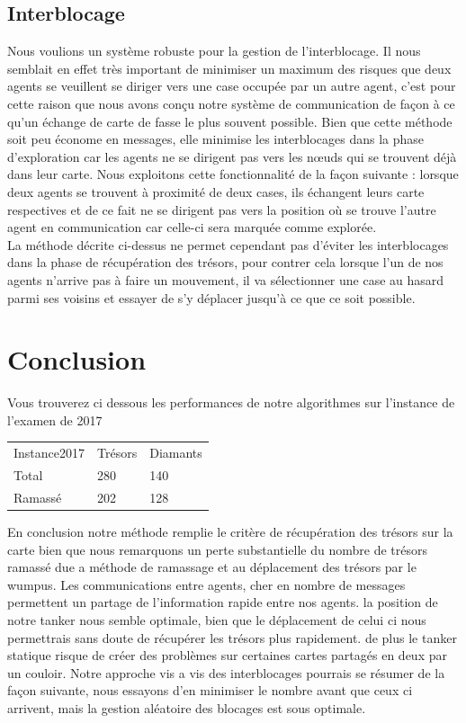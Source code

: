 \documentclass[10pt]{article}
\newcommand\tab[1][0.65cm]{\hspace*{#1}}
\begin{document}
	
\subsection{Interblocage}
\tab Nous voulions un système robuste pour la gestion de l'interblocage. Il nous semblait en effet très important de minimiser un maximum des risques que deux agents se veuillent se diriger vers une case occupée par un autre agent, c'est pour cette raison que nous avons conçu notre système de communication de façon à ce qu'un échange de carte de fasse le plus souvent possible. Bien que cette méthode soit peu économe en messages, elle minimise les interblocages dans la phase d'exploration car les agents ne se dirigent pas vers les n\oe{}uds qui se trouvent déjà dans leur carte. Nous exploitons cette fonctionnalité de la façon suivante : lorsque deux agents se trouvent à proximité de deux cases, ils échangent leurs carte respectives et de ce fait ne se dirigent pas vers la position où se trouve l'autre agent en communication car celle-ci sera marquée comme explorée.\\
\tab La méthode décrite ci-dessus ne permet cependant pas d'éviter les interblocages dans la phase de récupération des trésors, pour contrer cela lorsque l'un de nos agents n'arrive pas à faire un mouvement, il va sélectionner une case au hasard parmi ses voisins et essayer de s'y déplacer jusqu'à ce que ce soit possible.


\section{Conclusion}
\tab Vous trouverez ci dessous les performances de notre algorithmes sur l'instance de l'examen de 2017\\
\begin{center}
\begin{tabular}{lll}
   Instance2017 & Trésors & Diamants \\
   Total & 280 & 140\\
   Ramassé & 202 & 128 \\
\end{tabular}
\end{center}
\tab
En conclusion notre méthode remplie le critère de récupération des trésors sur la carte bien que nous remarquons un perte substantielle du nombre de trésors ramassé due a méthode de ramassage et au déplacement des trésors par le wumpus. Les communications entre agents, cher en nombre de messages permettent un partage de l'information rapide entre nos agents. la position de notre tanker nous semble optimale, bien que le déplacement de celui ci nous permettrais sans doute de récupérer les trésors plus rapidement. de plus le tanker statique risque de créer des problèmes sur certaines cartes partagés en deux par un couloir. Notre approche vis a vis des interblocages pourrais se résumer de la façon suivante, nous essayons d'en minimiser le nombre avant que ceux ci arrivent, mais la gestion aléatoire des blocages est sous optimale.
\end{document}
